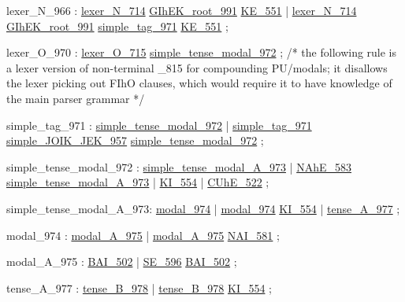 \label{html:y966}
lexer_N_966             :  \hyperref[html:y714]{lexer_N_714}  \hyperref[html:y991]{GIhEK_root_991}  \hyperref[html:y551]{KE_551}
                        |  \hyperref[html:y714]{lexer_N_714}  \hyperref[html:y991]{GIhEK_root_991}  \hyperref[html:y971]{simple_tag_971}  \hyperref[html:y551]{KE_551}
                        ;

\label{html:y970}
lexer_O_970             :  \hyperref[html:y715]{lexer_O_715}  \hyperref[html:y972]{simple_tense_modal_972}
                        ;
/* the following rule is a lexer version of non-terminal _815 for compounding
   PU/modals; it disallows the lexer picking out FIhO clauses, which would
   require it to have knowledge of the main parser grammar */

\label{html:y971}
simple_tag_971          :  \hyperref[html:y972]{simple_tense_modal_972}
                        |  \hyperref[html:y971]{simple_tag_971}  \hyperref[html:y957]{simple_JOIK_JEK_957}
                                \hyperref[html:y972]{simple_tense_modal_972}
                        ;

\label{html:y972}
simple_tense_modal_972  :  \hyperref[html:y973]{simple_tense_modal_A_973}
                        |  \hyperref[html:y583]{NAhE_583}  \hyperref[html:y973]{simple_tense_modal_A_973}
                        |  \hyperref[html:y554]{KI_554}
                        |  \hyperref[html:y522]{CUhE_522}
                        ;

\label{html:y973}
simple_tense_modal_A_973:  \hyperref[html:y974]{modal_974}
                        |  \hyperref[html:y974]{modal_974}  \hyperref[html:y554]{KI_554}
                        |  \hyperref[html:y977]{tense_A_977}
                        ;

\label{html:y974}
modal_974               :  \hyperref[html:y975]{modal_A_975}
                        |  \hyperref[html:y975]{modal_A_975}  \hyperref[html:y581]{NAI_581}
                        ;

\label{html:y975}
modal_A_975             :  \hyperref[html:y502]{BAI_502}
                        |  \hyperref[html:y596]{SE_596}  \hyperref[html:y502]{BAI_502}
                        ;

\label{html:y977}
tense_A_977             :  \hyperref[html:y978]{tense_B_978}
                        |  \hyperref[html:y978]{tense_B_978}  \hyperref[html:y554]{KI_554}
                        ;


